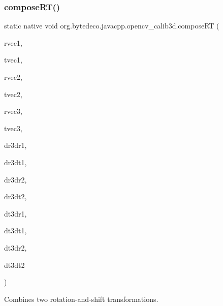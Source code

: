 \subsubsection{\texorpdfstring{compose\+R\+T()}{composeRT()}}
{\footnotesize\ttfamily static native void org.\+bytedeco.\+javacpp.\+opencv\+\_\+calib3d.\+compose\+RT (\begin{DoxyParamCaption}\item[{@By\+Val Mat}]{rvec1,  }\item[{@By\+Val Mat}]{tvec1,  }\item[{@By\+Val Mat}]{rvec2,  }\item[{@By\+Val Mat}]{tvec2,  }\item[{@By\+Val Mat}]{rvec3,  }\item[{@By\+Val Mat}]{tvec3,  }\item[{@By\+Val(null\+Value=\char`\"{}cv\+::\+Output\+Array(cv\+::no\+Array())\char`\"{}) Mat}]{dr3dr1,  }\item[{@By\+Val(null\+Value=\char`\"{}cv\+::\+Output\+Array(cv\+::no\+Array())\char`\"{}) Mat}]{dr3dt1,  }\item[{@By\+Val(null\+Value=\char`\"{}cv\+::\+Output\+Array(cv\+::no\+Array())\char`\"{}) Mat}]{dr3dr2,  }\item[{@By\+Val(null\+Value=\char`\"{}cv\+::\+Output\+Array(cv\+::no\+Array())\char`\"{}) Mat}]{dr3dt2,  }\item[{@By\+Val(null\+Value=\char`\"{}cv\+::\+Output\+Array(cv\+::no\+Array())\char`\"{}) Mat}]{dt3dr1,  }\item[{@By\+Val(null\+Value=\char`\"{}cv\+::\+Output\+Array(cv\+::no\+Array())\char`\"{}) Mat}]{dt3dt1,  }\item[{@By\+Val(null\+Value=\char`\"{}cv\+::\+Output\+Array(cv\+::no\+Array())\char`\"{}) Mat}]{dt3dr2,  }\item[{@By\+Val(null\+Value=\char`\"{}cv\+::\+Output\+Array(cv\+::no\+Array())\char`\"{}) Mat}]{dt3dt2 }\end{DoxyParamCaption})\hspace{0.3cm}{\ttfamily [static]}}



Combines two rotation-\/and-\/shift transformations. 


